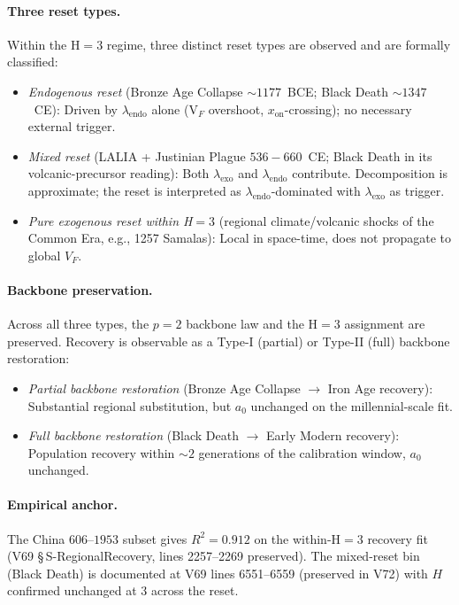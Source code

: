 \documentclass[11pt]{article}
\begin{document}
\paragraph{Three reset types.} Within the H$=3$ regime, three distinct reset types are observed and are formally classified:
\begin{itemize}\setlength\itemsep{0.1em}
  \item \emph{Endogenous reset} (Bronze Age Collapse $\sim\!1177$~BCE; Black Death $\sim\!1347$~CE): Driven by $\lambda_{\mathrm{endo}}$ alone (V$_{F}$ overshoot, $x_{\mathrm{on}}$-crossing); no necessary external trigger.
  \item \emph{Mixed reset} (LALIA + Justinian Plague $536{-}660$~CE; Black Death in its volcanic-precursor reading): Both $\lambda_{\mathrm{exo}}$ and $\lambda_{\mathrm{endo}}$ contribute. Decomposition is approximate; the reset is interpreted as $\lambda_{\mathrm{endo}}$-dominated with $\lambda_{\mathrm{exo}}$ as trigger.
  \item \emph{Pure exogenous reset within H$=3$} (regional climate/volcanic shocks of the Common Era, e.g., 1257 Samalas): Local in space-time, does not propagate to global $V_{F}$.
\end{itemize}

\paragraph{Backbone preservation.} Across all three types, the $p{=}2$ backbone law and the H$=3$ assignment are preserved. Recovery is observable as a Type-I (partial) or Type-II (full) backbone restoration:
\begin{itemize}\setlength\itemsep{0.1em}
  \item \emph{Partial backbone restoration} (Bronze Age Collapse $\to$ Iron Age recovery): Substantial regional substitution, but $a_{0}$ unchanged on the millennial-scale fit.
  \item \emph{Full backbone restoration} (Black Death $\to$ Early Modern recovery): Population recovery within $\sim\!2$ generations of the calibration window, $a_{0}$ unchanged.
\end{itemize}

\paragraph{Empirical anchor.} The China $606$--$1953$ subset gives $R^{2}=0.912$ on the within-H$=3$ recovery fit (V69 \S\,S-RegionalRecovery, lines 2257--2269 preserved). The mixed-reset bin (Black Death) is documented at V69 lines 6551--6559 (preserved in V72) with $H$ confirmed unchanged at $3$ across the reset.
\end{document}
